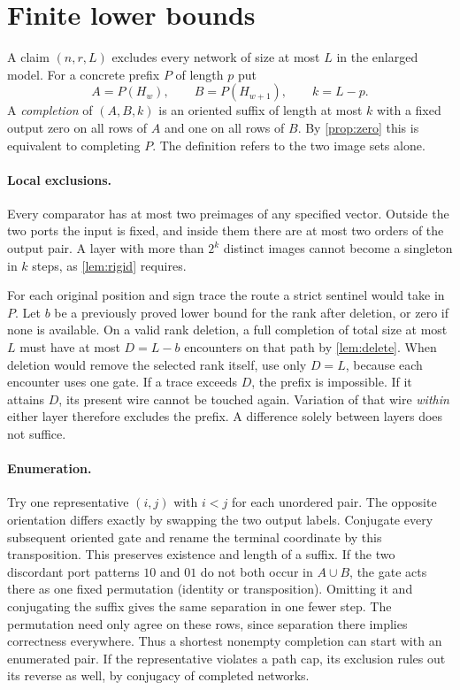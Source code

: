 \section{Finite lower bounds}\label{sec:finite}
A claim $(n,r,L)$ excludes every network of size at most $L$ in the enlarged
model. For a concrete prefix $P$ of length $p$ put
\[
 A=P(H_w),\qquad B=P(H_{w+1}),\qquad k=L-p.
\]
A \emph{completion} of $(A,B,k)$ is an oriented suffix of length at most
$k$ with a fixed output zero on all rows of $A$ and one on all rows of $B$.
By \cref{prop:zero} this is equivalent to completing $P$. The definition
refers to the two image sets alone.

\paragraph{Local exclusions.}
Every comparator has at most two preimages of any specified vector.
Outside the two ports the input is fixed, and inside them there are at
most two orders of the output pair. A layer with more than $2^k$ distinct
images cannot become a singleton in $k$ steps, as \cref{lem:rigid} requires.

For each original position and sign trace the route a strict sentinel would
take in $P$. Let $b$ be a previously proved lower bound for the rank after
deletion, or zero if none is available. On a valid rank deletion, a full
completion of total size at most $L$ must have at most $D=L-b$ encounters
on that path by \cref{lem:delete}. When deletion would remove the selected
rank itself, use only $D=L$, because each encounter uses one gate.
If a trace exceeds $D$, the prefix is impossible. If it attains $D$, its
present wire cannot be touched again. Variation of that wire \emph{within}
either layer therefore excludes the prefix. A difference solely between
layers does not suffice.

\paragraph{Enumeration.}
Try one representative $(i,j)$ with $i<j$ for each unordered pair.
The opposite orientation differs exactly by swapping the two output
labels. Conjugate every subsequent oriented gate and rename the terminal
coordinate by this transposition. This preserves existence and length of
a suffix. If the two discordant port patterns $10$ and $01$ do not both
occur in $A\cup B$, the gate acts there as one fixed permutation
(identity or transposition). Omitting it and conjugating the suffix gives
the same separation in one fewer step. The permutation need only agree on
these rows, since separation there implies correctness everywhere. Thus
a shortest nonempty completion can start with an enumerated pair. If the
representative violates a path cap, its exclusion rules out its reverse
as well, by conjugacy of completed networks.

